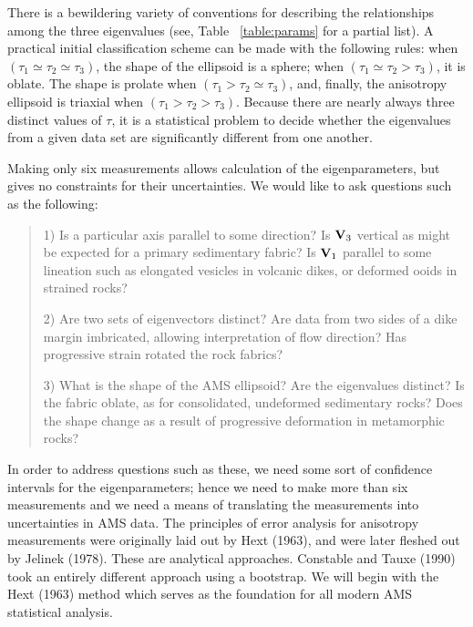 There is a bewildering variety of conventions for describing the
relationships among the three eigenvalues (see,  Table
~\ref{table:params} for a partial list).  A practical initial classification
scheme can be made with the following 
rules: when $(\tau_1 \simeq \tau_2 \simeq \tau_3)$, the shape of the ellipsoid is a sphere; when $(\tau_1
 \simeq \tau_2 >
\tau_3)$, it is oblate.  The shape is prolate when $(\tau_1 > 
\tau_2 \simeq \tau_3)$, and, finally, the anisotropy ellipsoid is triaxial
when  $(\tau_1 > \tau_2 > \tau_3)$.  Because there are nearly always
three distinct values of $\tau$,  
it is a statistical problem to decide whether
the eigenvalues from a given data set are significantly different 
from one another.

Making only six measurements allows calculation of the
eigenparameters, but gives no constraints for their uncertainties.  
We would like to ask questions such as the following:

\begin {quote}
1)  Is a particular axis parallel to some direction? 
Is $\hbox{\bf V}_3$  vertical as might be expected for a primary sedimentary fabric?
Is $\hbox{\bf V}_1$ parallel to some lineation such as elongated
vesicles in volcanic dikes, or deformed ooids in strained rocks?

2) Are two sets of eigenvectors distinct?  Are data
from two sides of a dike margin imbricated, allowing interpretation of
flow direction? Has progressive strain rotated the rock fabrics?

3) What is the shape of the AMS ellipsoid? Are the eigenvalues distinct?
Is the fabric oblate, as for  consolidated, undeformed sedimentary rocks?  Does the shape
change as a result of progressive deformation in metamorphic rocks? 

\end{quote}


In order to address questions such as these,
 we need some sort of confidence intervals
for the eigenparameters; hence we need to make 
more than six measurements and we need a 
means of translating the measurements into uncertainties in AMS data.  
The principles of error analysis for anisotropy measurements were originally
laid out by
  Hext (1963),   \nocite{hext63}  and were later fleshed out by 
  Jelinek (1978).  \nocite{jelinek78}  These are analytical approaches.  
Constable and Tauxe (1990) \nocite{constable90}
took an entirely different approach using a bootstrap.  We will begin with the 
Hext (1963) \nocite{hext63}
method which serves as the foundation for all modern AMS statistical analysis.  

